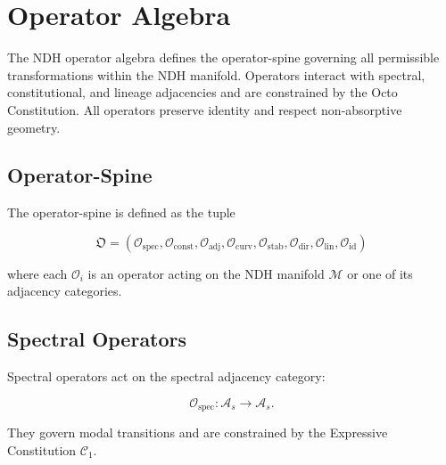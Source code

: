 
\section{Operator Algebra}
\label{sec:operator-algebra}

The NDH operator algebra defines the operator-spine governing all permissible
transformations within the NDH manifold. Operators interact with spectral,
constitutional, and lineage adjacencies and are constrained by the Octo
Constitution. All operators preserve identity and respect non-absorptive
geometry.


\subsection{Operator-Spine}

The operator-spine is defined as the tuple

\[
\mathfrak{O} =
(\mathcal{O}_{\mathrm{spec}},
 \mathcal{O}_{\mathrm{const}},
 \mathcal{O}_{\mathrm{adj}},
 \mathcal{O}_{\mathrm{curv}},
 \mathcal{O}_{\mathrm{stab}},
 \mathcal{O}_{\mathrm{dir}},
 \mathcal{O}_{\mathrm{lin}},
 \mathcal{O}_{\mathrm{id}})
\]

where each $\mathcal{O}_i$ is an operator acting on the NDH manifold
$\mathcal{M}$ or one of its adjacency categories.


\subsection{Spectral Operators}

Spectral operators act on the spectral adjacency category:

\[
\mathcal{O}_{\mathrm{spec}} :
\mathcal{A}_s \to \mathcal{A}_s.
\]

They govern modal transitions and are constrained by the Expressive
Constitution $\mathcal{C}_1$.

